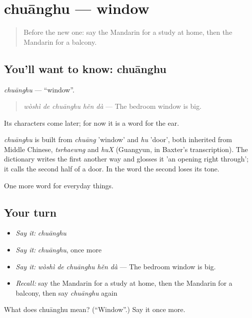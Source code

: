 \section[chuānghu]{chuānghu — window}

\label{lesson:ZH-C159-chuanghu}



\begin{quote}
Before the new one: say the Mandarin for a study at home, then the Mandarin for a balcony.
\end{quote}

\subsection*{You'll want to know: chuānghu}
\emph{chuānghu} — \textquotedblleft{}window\textquotedblright{}.

\begin{quote}
\emph{wòshì de chuānghu hěn dà} — The bedroom window is big.
\end{quote}

Its characters come later; for now it is a word for the ear.

\begin{cousinweb}
\emph{chuānghu} is built from \emph{chuāng} 'window' and \emph{hu} 'door', both inherited from Middle Chinese, \emph{tsrhaewng} and \emph{huX} (Guangyun, in Baxter's transcription). The dictionary writes the first another way and glosses it 'an opening right through'; it calls the second half of a door. In the word the second loses its tone.
\end{cousinweb}

\begin{grammarlens}[title={What you've built}]
One more word for everyday things.
\end{grammarlens}

\subsection*{Your turn}
\begin{itemize}
\raggedright
  \item \emph{Say it:} \emph{chuānghu}
  \item \emph{Say it:} \emph{chuānghu}, once more
  \item \emph{Say it:} \emph{wòshì de chuānghu hěn dà} — The bedroom window is big.
  \item \emph{Recall:} say the Mandarin for a study at home, then the Mandarin for a balcony, then say \emph{chuānghu} again
\end{itemize}

\begin{tcolorbox}[breakable,colback=teal!4,colframe=teal!35!black,title={Before you move on}]
What does chuānghu mean? (\textquotedblleft{}Window\textquotedblright{}.) Say it once more.
\end{tcolorbox}
